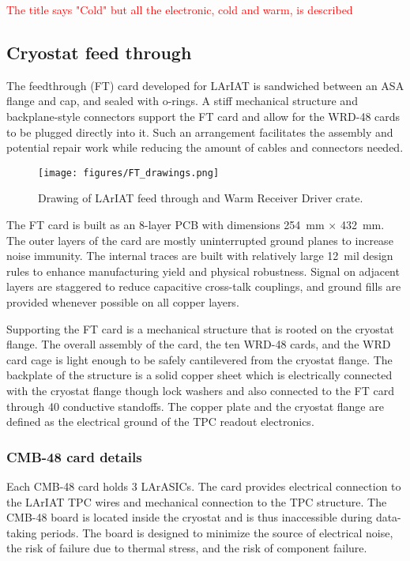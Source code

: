 


\textcolor{red}{The title says "Cold" but all the electronic, cold and warm, is described}


\subsection*{Cryostat feed through}
The feedthrough (FT) card developed for LArIAT is sandwiched between an ASA flange and cap, and sealed with o-rings. A stiff mechanical structure and backplane-style connectors support the FT card and allow for the WRD-48 cards to be plugged directly into it. Such an arrangement facilitates the assembly and potential repair work while reducing the amount of cables and connectors needed.

\begin{figure}[htbp]
 \centering
 \texttt{[image: figures/FT\_drawings.png]}
\caption{
Drawing of LArIAT feed through and Warm Receiver Driver crate. 
} 
\label{pic:FeedthroughElectronics}
\end{figure}

The FT card is built as an 8-layer PCB with dimensions 254~mm $\times$ 432~mm. The outer layers of the card are mostly uninterrupted ground planes to increase noise immunity. The internal traces are built with relatively large 12~mil design rules to enhance manufacturing yield and physical robustness. Signal on adjacent layers are staggered to reduce capacitive cross-talk couplings, and ground fills are provided whenever possible on all copper layers.

Supporting the FT card is a mechanical structure that is rooted on the cryostat flange. The overall assembly of the card, the ten WRD-48 cards, and the WRD card cage is light enough to be safely cantilevered from the cryostat flange. The backplate of the structure is a solid copper sheet which is electrically connected with the cryostat flange though lock washers and also connected to the FT card through 40 conductive standoffs. The copper plate and the cryostat flange are defined as the electrical ground of the TPC readout electronics.

\subsubsection*{CMB-48 card details}
Each CMB-48 card holds 3 LArASICs. The card provides electrical connection to the LArIAT TPC wires and mechanical connection to the TPC structure. The CMB-48 board is located inside the cryostat and is thus inaccessible during data-taking periods. The board is designed to minimize the source of electrical noise, the risk of failure due to thermal stress, and the risk of component failure.


